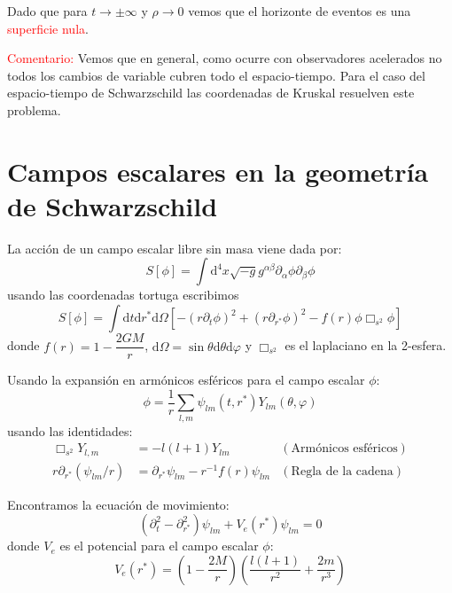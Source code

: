 \documentclass[../main]{subfiles}
\begin{document}
Dado que para $t\rightarrow \pm \infty$ y $\rho \rightarrow 0$ vemos que el horizonte de eventos es una \textcolor{red}{superficie nula}.

\textcolor{red}{Comentario:} Vemos que en general, como ocurre con observadores acelerados no todos los cambios de variable cubren todo el espacio-tiempo. Para el caso del espacio-tiempo de Schwarzschild las coordenadas de Kruskal resuelven este problema.

\section{Campos escalares en la geometría de Schwarzschild}

La acción de un campo escalar libre sin masa viene dada por:
\begin{equation}
    S[\phi]=\int \mathrm{d}^4 x \sqrt{-g} g^{\alpha\beta}\partial_{\alpha} \phi \partial_{\beta} \phi
\end{equation}
usando las coordenadas tortuga escribimos
\begin{equation}
    S[\phi]=\int \mathrm{d}t\mathrm{d}r^* \mathrm{d}\Omega \left[-(r\partial_t \phi)^2+(r\partial_{r^*} \phi)^2-f(r)\phi \Box_{s^2}\phi \right]
\end{equation}
donde $\displaystyle f(r)=1-\dfrac{2GM}{r}$, $\mathrm{d}\Omega=\sin \theta \mathrm{d}\theta \mathrm{d}\varphi$ y $\Box_{s^2}$ es el laplaciano en la 2-esfera.

Usando la expansión en armónicos esféricos para el campo escalar $\phi$:
\begin{equation}
    \phi=\dfrac{1}{r}\sum_{l, m} \psi_{lm}(t, r^*) Y_{lm}(\theta, \varphi)
\end{equation}
usando las identidades:
\begin{align}
    \Box_{s^2}Y_{l, m}&=-l(l+1)Y_{lm} &(\text{Armónicos esféricos})\\
    r\partial_{r^*}(\psi_{lm}/r)&=\partial_{r^*}\psi_{lm}-r^{-1}f(r)\psi_{lm} &(\text{Regla de la cadena})
\end{align}

Encontramos la ecuación de movimiento:
\begin{equation}
    (\partial^2_t-\partial^2_{r^*})\psi_{lm}+V_e(r^*)\psi_{lm}=0
\end{equation}
donde $V_e$ es el potencial para el campo escalar $\phi$:
\begin{equation}
    V_e(r^*)=\left(1-\dfrac{2M}{r}\right)\left(\dfrac{l(l+1)}{r^2}+\dfrac{2m}{r^3}\right)
\end{equation}
\end{document}

